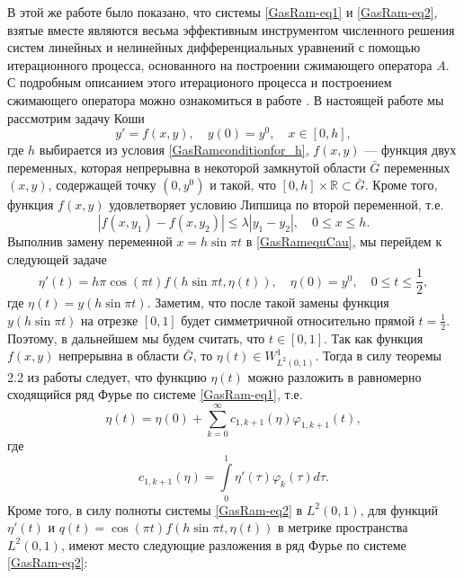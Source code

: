 В этой же работе было показано, что системы \eqref{GasRam-eq1} и \eqref{GasRam-eq2}, взятые вместе являются весьма эффективным инструментом численного решения систем линейных и нелинейных дифференциальных уравнений с помощью итерационного процесса, основанного на построении сжимающего оператора $A$. С подробным описанием этого итерационого процесса и построением сжимающего оператора можно ознакомиться в работе \cite{RamSharDemr}. В настоящей работе мы рассмотрим задачу Коши
\begin{equation}\label{GasRamequCau}
y{'} = f(x,y), \quad y(0) = y^0, \quad x \in [0, h],
\end{equation}
где $h$ выбирается из условия \eqref{GasRamconditionfor_h}, $f(x,y)$ --- функция двух переменных, которая непрерывна в некоторой замкнутой области $\bar{G}$ переменных $(x,y)$, содержащей точку $(0,y^0)$ и такой, что  $[0,h]\times\mathbb{R}\subset\bar G$.
Кроме того, функция $f(x,y)$ удовлетворяет условию Липшица по второй переменной, т.е.
\begin{equation*}
 \left|f(x,y_{1})-f(x,y_{2})\right|\leq\lambda\left|y_{1}-y_{2}\right|,\quad0\leq x\leq h.
\end{equation*}
Выполнив замену переменной $x = h\sin \pi t$ в \eqref{GasRamequCau}, мы перейдем к следующей задаче
\begin{equation}\label{GasRamequafterrep}
\eta{'}(t) = h\pi \cos(\pi t) f(h\sin \pi t, \eta(t)), \quad \eta(0) = y^0, \quad 0 \leq t \leq \frac{1}{2},
\end{equation}
где
$\eta(t)=y(h\sin \pi t)$. Заметим, что после такой замены функция $y(h\sin \pi t)$ на отрезке $[0,1]$ будет симметричной относительно прямой $t=\frac{1}{2}$. Поэтому, в дальнейшем мы будем считать, что $t\in[0,1]$.
Так как функция $f(x,y)$ непрерывна в области $\bar{G}$, то $\eta(t)\in W^1_{L^2(0,1)}$. Тогда в силу теоремы 2.2 из работы \cite{RamShaIzv} следует, что функцию  $\eta(t)$ можно разложить в равномерно сходящийся ряд Фурье по системе \eqref{GasRam-eq1}, т.е.
\begin{equation}\label{GasRamFourierserforg}
\eta(t) = \eta(0)+\sum_{k=0}^\infty c_{1,k+1}(\eta)\varphi_{1,k+1}(t),
\end{equation}
где
$$
c_{1,k+1}(\eta)=\int\limits_0^1\eta{'}(\tau)\varphi_k(\tau)d\tau.
$$
Кроме того, в силу полноты системы \eqref{GasRam-eq2} в $L^2(0,1)$, для функций $\eta{'}(t)$ и \linebreak$q(t)=\cos(\pi t) f(h\sin \pi t, \eta(t))$ в метрике пространства $L^2(0,1)$, имеют место следующие разложения в ряд Фурье по системе \eqref{GasRam-eq2}:
